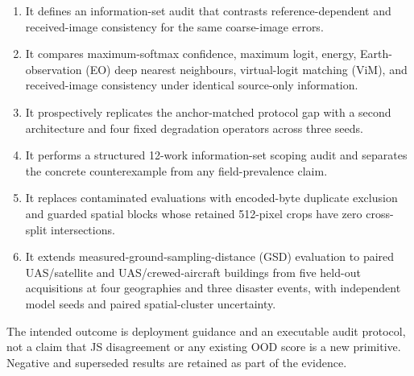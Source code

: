 \begin{enumerate}
\item It defines an information-set audit that contrasts
reference-dependent and received-image consistency for the same coarse-image
errors.
\item It compares maximum-softmax confidence, maximum logit, energy, Earth-
observation (EO) deep nearest neighbours, virtual-logit matching (ViM), and
received-image consistency under identical source-only information.
\item It prospectively replicates the anchor-matched protocol gap with a second
architecture and four fixed degradation operators across three seeds.
\item It performs a structured 12-work information-set scoping audit and
separates the concrete counterexample from any field-prevalence claim.
\item It replaces contaminated evaluations with encoded-byte duplicate
exclusion and guarded spatial blocks whose retained 512-pixel crops have zero
cross-split intersections.
\item It extends measured-ground-sampling-distance (GSD) evaluation to paired
UAS/satellite and UAS/crewed-aircraft buildings from five held-out acquisitions
at four geographies and three disaster events, with independent model seeds and
paired spatial-cluster uncertainty.
\end{enumerate}

The intended outcome is deployment guidance and an executable audit protocol,
not a claim that JS disagreement or any existing OOD score is a new primitive.
Negative and superseded results are retained as part of the evidence.
